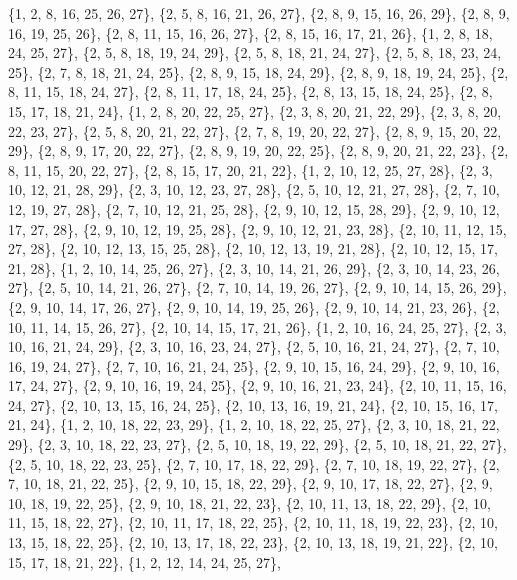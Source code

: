 \documentclass[11pt,a4paper]{article}
\begin{document}
{\{1, 2, 8, 16, 25, 26, 27\}, \{2, 5, 8, 16, 21, 26, 27\}, \{2, 8, 9, 15, 16, 26, 29\}, \{2, 8, 9, 16, 19, 25, 26\}, \{2, 8, 11, 15, 16, 26, 27\},
\{2, 8, 15, 16, 17, 21, 26\}, \{1, 2, 8, 18, 24, 25, 27\}, \{2, 5, 8, 18, 19, 24, 29\}, \{2, 5, 8, 18, 21, 24, 27\}, \{2, 5, 8, 18, 23, 24, 25\},
\{2, 7, 8, 18, 21, 24, 25\}, \{2, 8, 9, 15, 18, 24, 29\}, \{2, 8, 9, 18, 19, 24, 25\}, \{2, 8, 11, 15, 18, 24, 27\}, \{2, 8, 11, 17, 18, 24, 25\},
\{2, 8, 13, 15, 18, 24, 25\}, \{2, 8, 15, 17, 18, 21, 24\}, \{1, 2, 8, 20, 22, 25, 27\}, \{2, 3, 8, 20, 21, 22, 29\}, \{2, 3, 8, 20, 22, 23, 27\},
\{2, 5, 8, 20, 21, 22, 27\}, \{2, 7, 8, 19, 20, 22, 27\}, \{2, 8, 9, 15, 20, 22, 29\}, \{2, 8, 9, 17, 20, 22, 27\}, \{2, 8, 9, 19, 20, 22, 25\},
\{2, 8, 9, 20, 21, 22, 23\}, \{2, 8, 11, 15, 20, 22, 27\}, \{2, 8, 15, 17, 20, 21, 22\}, \{1, 2, 10, 12, 25, 27, 28\}, \{2, 3, 10, 12, 21, 28, 29\},
\{2, 3, 10, 12, 23, 27, 28\}, \{2, 5, 10, 12, 21, 27, 28\}, \{2, 7, 10, 12, 19, 27, 28\}, \{2, 7, 10, 12, 21, 25, 28\}, \{2, 9, 10, 12, 15, 28, 29\},
\{2, 9, 10, 12, 17, 27, 28\}, \{2, 9, 10, 12, 19, 25, 28\}, \{2, 9, 10, 12, 21, 23, 28\}, \{2, 10, 11, 12, 15, 27, 28\}, \{2, 10, 12, 13, 15, 25, 28\},
\{2, 10, 12, 13, 19, 21, 28\}, \{2, 10, 12, 15, 17, 21, 28\}, \{1, 2, 10, 14, 25, 26, 27\}, \{2, 3, 10, 14, 21, 26, 29\}, \{2, 3, 10, 14, 23, 26, 27\},
\{2, 5, 10, 14, 21, 26, 27\}, \{2, 7, 10, 14, 19, 26, 27\}, \{2, 9, 10, 14, 15, 26, 29\}, \{2, 9, 10, 14, 17, 26, 27\}, \{2, 9, 10, 14, 19, 25, 26\},
\{2, 9, 10, 14, 21, 23, 26\}, \{2, 10, 11, 14, 15, 26, 27\}, \{2, 10, 14, 15, 17, 21, 26\}, \{1, 2, 10, 16, 24, 25, 27\}, \{2, 3, 10, 16, 21, 24, 29\},
\{2, 3, 10, 16, 23, 24, 27\}, \{2, 5, 10, 16, 21, 24, 27\}, \{2, 7, 10, 16, 19, 24, 27\}, \{2, 7, 10, 16, 21, 24, 25\}, \{2, 9, 10, 15, 16, 24, 29\},
\{2, 9, 10, 16, 17, 24, 27\}, \{2, 9, 10, 16, 19, 24, 25\}, \{2, 9, 10, 16, 21, 23, 24\}, \{2, 10, 11, 15, 16, 24, 27\}, \{2, 10, 13, 15, 16, 24, 25\},
\{2, 10, 13, 16, 19, 21, 24\}, \{2, 10, 15, 16, 17, 21, 24\}, \{1, 2, 10, 18, 22, 23, 29\}, \{1, 2, 10, 18, 22, 25, 27\}, \{2, 3, 10, 18, 21, 22, 29\},
\{2, 3, 10, 18, 22, 23, 27\}, \{2, 5, 10, 18, 19, 22, 29\}, \{2, 5, 10, 18, 21, 22, 27\}, \{2, 5, 10, 18, 22, 23, 25\}, \{2, 7, 10, 17, 18, 22, 29\},
\{2, 7, 10, 18, 19, 22, 27\}, \{2, 7, 10, 18, 21, 22, 25\}, \{2, 9, 10, 15, 18, 22, 29\}, \{2, 9, 10, 17, 18, 22, 27\}, \{2, 9, 10, 18, 19, 22, 25\},
\{2, 9, 10, 18, 21, 22, 23\}, \{2, 10, 11, 13, 18, 22, 29\}, \{2, 10, 11, 15, 18, 22, 27\}, \{2, 10, 11, 17, 18, 22, 25\}, \{2, 10, 11, 18, 19, 22, 23\},
\{2, 10, 13, 15, 18, 22, 25\}, \{2, 10, 13, 17, 18, 22, 23\}, \{2, 10, 13, 18, 19, 21, 22\}, \{2, 10, 15, 17, 18, 21, 22\}, \{1, 2, 12, 14, 24, 25, 27\},
}
\end{document}
